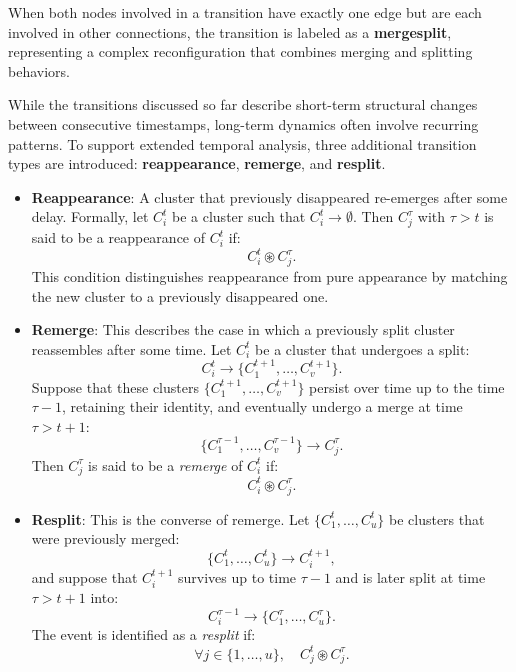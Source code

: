 When both nodes involved in a transition have exactly one edge but are each
involved in other connections, the transition is labeled as a
\textbf{mergesplit}, representing a complex reconfiguration that combines
merging and splitting behaviors.



While the transitions discussed so far describe short-term structural changes
between consecutive timestamps, long-term dynamics often involve recurring
patterns. To support extended temporal analysis, three additional transition
types are introduced: \textbf{reappearance}, \textbf{remerge}, and
\textbf{resplit}.

\begin{itemize}
      \item \textbf{Reappearance}: A cluster that previously disappeared
            re-emerges after some delay. Formally, let $C_i^t$ be a cluster
            such that $C_i^t \rightarrow \emptyset$. Then $C_j^\tau$ with $\tau > t$
            is said to be a reappearance of $C_i^t$ if:
            \[
                  C_i^t \circledast C_j^\tau.
            \]
            This condition distinguishes reappearance from pure appearance by matching the
            new cluster to a previously disappeared one.

      \item \textbf{Remerge}: This describes the case in which a previously
            split cluster reassembles after some time. Let $C_i^t$ be a cluster
            that undergoes a split:
            \[
                  C_i^t \rightarrow \{C_1^{t+1}, \dots, C_v^{t+1}\}.
            \]
            Suppose that these clusters $\{C_1^{t+1}, \dots, C_v^{t+1}\}$ persist over time
            up to the time $\tau - 1$, retaining their identity, and eventually undergo a
            merge at time $\tau > t + 1$:
            \[
                  \{C_1^{\tau - 1}, \dots, C_v^{\tau - 1}\} \rightarrow C_j^{\tau}.
            \]
            Then $C_j^{\tau}$ is said to be a \emph{remerge} of $C_i^t$ if:
            \[
                  C_i^t \circledast C_j^{\tau}.
            \]

      \item \textbf{Resplit}: This is the converse of remerge. Let $\{C_1^t, \dots, C_u^t\}$ be clusters that were previously merged:
            \[
                  \{C_1^t, \dots, C_u^t\} \rightarrow C_i^{t+1},
            \]
            and suppose that $C_i^{t+1}$ survives up to time $ \tau - 1 $ and is later
            split at time $\tau > t+1$ into:
            \[
                  C_i^{\tau - 1} \rightarrow \{C_1^{\tau}, \dots, C_u^{\tau}\}.
            \]
            The event is identified as a \emph{resplit} if:
            \[
                  \forall j \in \{1, \dots, u\}, \quad C_j^t \circledast C_j^{\tau}.
            \]
\end{itemize}

